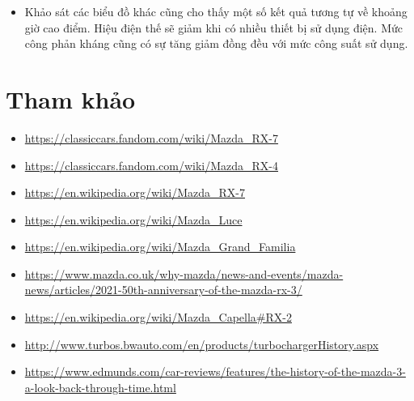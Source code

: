 \documentclass[a4paper, 12pt]{article}
\begin{document}
        \begin{itemize}
            \item Khảo sát các biểu đồ khác cũng cho thấy một số kết quả tương tự về khoảng giờ cao điểm. Hiệu điện thế sẽ giảm khi có nhiều thiết bị sử dụng điện. Mức công phản kháng cũng có sự tăng giảm đồng đều với mức công suất sử dụng.
        \end{itemize}

\clearpage

\section{Tham khảo}

    \begin{itemize}
        \item \url{https://classiccars.fandom.com/wiki/Mazda_RX-7}
        \item \url{https://classiccars.fandom.com/wiki/Mazda_RX-4}
        \item \url{https://en.wikipedia.org/wiki/Mazda_RX-7}
        \item \url{https://en.wikipedia.org/wiki/Mazda_Luce}
        \item \url{https://en.wikipedia.org/wiki/Mazda_Grand_Familia}
        \item \url{https://www.mazda.co.uk/why-mazda/news-and-events/mazda-news/articles/2021-50th-anniversary-of-the-mazda-rx-3/}
        \item \url{https://en.wikipedia.org/wiki/Mazda_Capella#RX-2}
        \item \url{http://www.turbos.bwauto.com/en/products/turbochargerHistory.aspx}
        \item \url{https://www.edmunds.com/car-reviews/features/the-history-of-the-mazda-3-a-look-back-through-time.html}
    \end{itemize}
\end{document}

